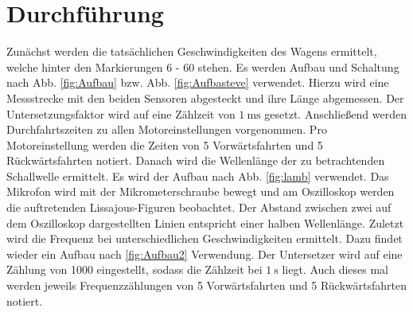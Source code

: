 
\section{Durchführung}
\label{sec:Durchführung}

\renewcommand{\labelenumi}{\alph{enumi})}
Zunächst werden die tatsächlichen Geschwindigkeiten des Wagens ermittelt, welche
 hinter den Markierungen 6 - 60 stehen. Es werden Aufbau und Schaltung nach Abb. \ref{fig:Aufbau} bzw. Abb. \ref{fig:Aufbasteve} verwendet. Hierzu wird eine Messstrecke mit den
  beiden Sensoren abgesteckt und ihre Länge abgemessen. Der Untersetzungsfaktor wird auf eine Zählzeit von $\SI{1}{\milli\second}$ gesetzt. Anschließend werden
   Durchfahrtszeiten zu allen Motoreinstellungen vorgenommen. Pro Motoreinstellung
    werden die Zeiten von 5 Vorwärtsfahrten und 5 Rückwärtsfahrten notiert. Danach
     wird die Wellenlänge der zu betrachtenden Schallwelle ermittelt. Es wird der Aufbau nach Abb. \ref{fig:lamb} verwendet.
      Das Mikrofon wird mit der Mikrometerschraube bewegt und am Oszilloskop werden
       die auftretenden Lissajous-Figuren beobachtet. Der Abstand zwischen zwei
        auf dem Oszilloskop dargestellten Linien entspricht einer halben Wellenlänge.
         Zuletzt wird die Frequenz bei unterschiedlichen Geschwindigkeiten ermittelt.
          Dazu findet wieder ein Aufbau nach \ref{fig:Aufbau2} Verwendung. Der
          Untersetzer wird auf eine Zählung von 1000 eingestellt, sodass die Zählzeit bei $\SI{1}{\second}$ liegt.
          Auch dieses mal werden jeweils Frequenzzählungen von 5 Vorwärtsfahrten und 5 Rückwärtsfahrten notiert.
